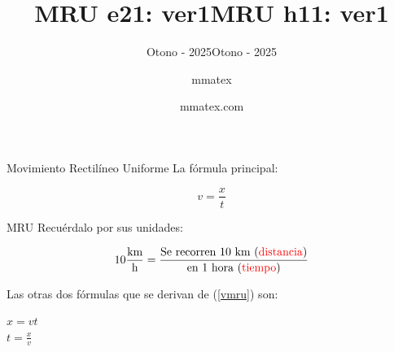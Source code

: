 \documentclass{beamer}
\title{MRU e21: ver1}
\subtitle{Otono - 2025}
\author{mmatex}
\title{MRU h11: ver1}
\subtitle{Otono - 2025}
\author{mmatex.com}
\begin{document}
\frame{\titlepage}

\begin{frame}{Movimiento Rectil\'ineo Uniforme}
La f\'ormula principal:

\begin{equation}
\label{vmru}
v = \frac{x}{t}
\end{equation}

\vNUa %
\end{frame}

\begin{frame}{MRU}
Recu\'erdalo por sus unidades:

\begin{equation*}
10\frac{\text{km}}{\text{h}} =
\frac{\text{Se recorren 10 km ({\color{red} distancia})}}
{\text{en 1 hora ({\color{red} tiempo})}}
\end{equation*}

Las otras dos f\'ormulas que se derivan de (\ref{vmru}) son:

{\large \( x = vt \) \\ \( t = \frac{x}{v} \)}
\end{frame}
\end{document}
